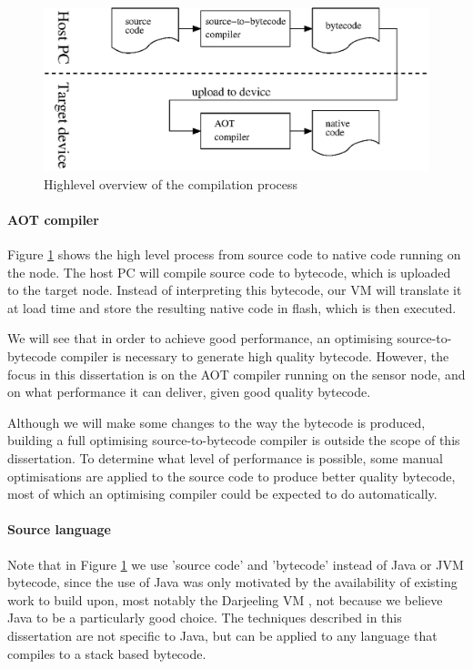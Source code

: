 \begin{figure}
\centering
\includegraphics[width=0.8\linewidth]{compilation-process-highlevel.eps}
\caption{Highlevel overview of the compilation process}
\label{fig-compilation-process-highlevel}
\end{figure}

\paragraph{AOT compiler}
Figure \ref{fig-compilation-process-highlevel} shows the high level process from source code to native code running on the node. The host PC will compile source code to bytecode, which is uploaded to the target node. Instead of interpreting this bytecode, our VM will translate it at load time and store the resulting native code in flash, which is then executed.

We will see that in order to achieve good performance, an optimising source-to-bytecode compiler is necessary to generate high quality bytecode. However, the focus in this dissertation is on the AOT compiler running on the sensor node, and on what performance it can deliver, given good quality bytecode.

Although we will make some changes to the way the bytecode is produced, building a full optimising source-to-bytecode compiler is outside the scope of this dissertation. To determine what level of performance is possible, some manual optimisations are applied to the source code to produce better quality bytecode, most of which an optimising compiler could be expected to do automatically.

\paragraph{Source language}
Note that in Figure \ref{fig-compilation-process-highlevel} we use 'source code' and 'bytecode' instead of Java or JVM bytecode, since the use of Java was only motivated by the availability of existing work to build upon, most notably the Darjeeling VM \cite{Brouwers:2009cj}, not because we believe Java to be a particularly good choice. The techniques described in this dissertation are not specific to Java, but can be applied to any language that compiles to a stack based bytecode.

